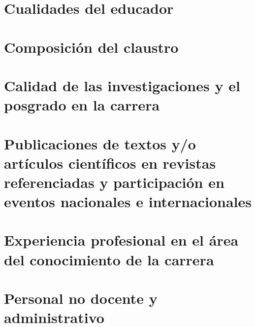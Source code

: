 \section{Cualidades del educador}



\section{Composición del claustro}



\section{Calidad de las investigaciones y el posgrado en la carrera}



\section{Publicaciones de textos y/o artículos científicos en revistas referenciadas y participación en eventos nacionales e internacionales}



\section{Experiencia profesional en el área del conocimiento de la carrera}



\section{Personal no docente y administrativo}

